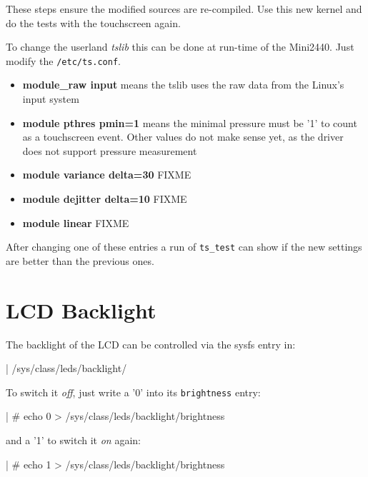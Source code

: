 These steps ensure the modified sources are re-compiled. Use this new kernel
and do the tests with the touchscreen again.

To change the userland \textit{tslib} this can be done at run-time of
the Mini2440. Just modify the \texttt{/etc/ts.conf}.

\begin{itemize}
	\item \textbf{module\_raw input} means the tslib uses the raw data from
		the Linux's input system
	\item \textbf{module pthres pmin=1} means the minimal pressure must be
		'1' to count as a touchscreen event. Other values do not make
		sense yet, as the driver does not support pressure measurement
	\item \textbf{module variance delta=30} FIXME
	\item \textbf{module dejitter delta=10} FIXME
	\item \textbf{module linear} FIXME
\end{itemize}

After changing one of these entries a run of \texttt{ts\_test} can show if the
new settings are better than the previous ones.


\section{LCD Backlight}				\label{sec:BLIGHT}

The backlight of the LCD can be controlled via the sysfs entry in:

\begin{ptxshell}{|}
/sys/class/leds/backlight/
\end{ptxshell}

To switch it \textit{off}, just write a '0' into its \texttt{brightness} entry:

\begin{ptxshell}{|}
# echo 0 > /sys/class/leds/backlight/brightness
\end{ptxshell}

and a '1' to switch it \textit{on} again:

\begin{ptxshell}{|}
# echo 1 > /sys/class/leds/backlight/brightness
\end{ptxshell}



